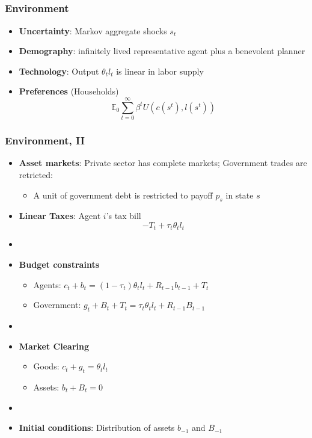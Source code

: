 \documentclass{beamer}
\begin{document}
\subsection{}

\begin{frame}
 \frametitle{Environment}
 \begin{itemize}
 \item \textbf{Uncertainty}: Markov aggregate shocks $s_t$
  \item \textbf{Demography}: infinitely lived representative agent plus a benevolent planner
  \item \textbf{Technology}: Output  $\theta_{t} l_{t}$ is linear in labor supply
  \item \textbf{Preferences }(Households)
  \begin{equation*}
\mathbb{E}_{0}\sum_{t=0}^{\infty } \beta^t  U\left(
c(s^t),l(s^t)\right)  \label{utility lifetime}
\end{equation*}%
 \end{itemize}

\end{frame}

\begin{frame}
 \frametitle{Environment, II}
 \begin{itemize}
\item \textbf{Asset markets}: Private sector has complete markets; Government trades are retricted:
\begin{itemize}
	\item  A unit of government debt is restricted to payoff $p_s$ in state $s$
\end{itemize}
  \item \textbf{Linear Taxes}: Agent $i$'s tax bill
\[- T_t + \tau_t \theta_{t}l_{t}\]

\item[]
  \item \textbf{Budget constraints}
  \begin{itemize}
   \item Agents: $ c_{t}+b_{t}=\left( 1-\tau _{t}\right) \theta _{t}l_{t}+R_{t-1}b_{t-1}+T_{t}$
\item Government: $g_{t}+B_{t}+T_t=\tau _{t}\theta_{t}l_{t}+R_{t-1}B_{t-1}$
  \end{itemize}

\item[]
  \item \textbf{Market Clearing}
  \begin{itemize}
   \item Goods: $c_{t}+g_t = \theta _{t} l_{t}$

   \item Assets: $b_{t}+B_{t}=0$
\end{itemize}
  \item[]

\item \textbf{Initial conditions}: Distribution of assets $b_{-1}$ and $B_{-1}$
\end{itemize}

\end{frame}
\end{document}
